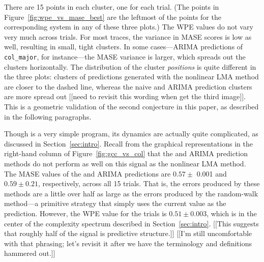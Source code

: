 There are 15 points in each cluster, one for each trial.  (The points
in Figure~\ref{fig:wpe_vs_mase_best} are the leftmost of the points
for the corresponding system in any of these three plots.)  The WPE
values do not vary very much across trials.  For most traces, the
variance in MASE scores is low as well, resulting in small, tight
clusters.  In some cases---ARIMA predictions of {\tt col\_major}, for
instance---the MASE variance is larger, which spreads out the clusters
horizontally.  The distribution of the cluster {\sl positions} is
quite different in the three plots: clusters of predictions generated
with the nonlinear LMA method are closer to the dashed line, whereas
the naive and ARIMA prediction clusters are more spread out {\color{red}[[need to
    revisit this wording when get the third image]]}.  This is a
geometric validation of the second conjecture in this paper, as
described in the following paragraphs.

Though \col is a very simple program, its dynamics are actually quite
complicated, as discussed in Section~\ref{sec:intro}.  Recall from the
graphical representations in the right-hand column of
Figure~\ref{fig:gcc_vs_col} that the \naive and ARIMA prediction
methods do not perform as well on this signal as the nonlinear LMA
method.  The MASE values of the \naive and ARIMA predictions are $0.57
\pm$ 0.001 and $0.59 \pm 0.21$, respectively, across all 15 trials.
That is, the errors produced by these methods are a little over half
as large as the errors produced by the random-walk method---a
primitive strategy that simply uses the current value as the
prediction.  However, the WPE value for the \col trials is $0.51 \pm
0.003$, which is in the center of the complexity spectrum described in
Section~\ref{sec:intro}.  {\color{red}[[This suggests that roughly half of the
    signal is predictive structure.]]  [[I'm still uncomfortable with
    that phrasing; let's revisit it after we have the terminology and
    definitions hammered out.]]  }


